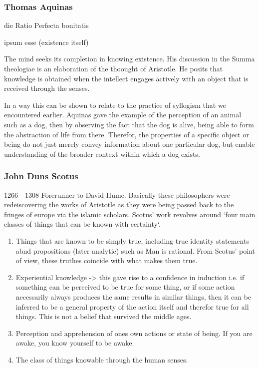 \documentclass[11pt]{article}
\begin{document}
\subsubsection{Thomas Aquinas}
\label{sec:org2318fad}
die Ratio Perfecta bonitatis

ipsum esse (existence itself)

The mind seeks its completion in knowing existence.
His discussion in the Summa theologiae is an elaboration of the thoought
of Aristotle. He posits that knowledge is obtained when the intellect 
engages actively with an object that is received through the senses. 

In a way this can be shown to relate to the practice of syllogism
that we encountered earlier. Aquinas gave the example of the perception
of an animal such as a dog, then by observing the fact that the dog is
alive, being able to form the abstraction of life from there. Therefor, 
the properties of a specific object or being do not just merely convey
information about one particular dog, but enable understanding of the 
broader context within which a dog exists.

\subsubsection{John Duns Scotus}
\label{sec:org94ce1eb}
1266 - 1308
Forerunner to David Hume. Basically these philosophers were
redeiscovering the works of Aristotle as they were being passed back
to the fringes of europe via the islamic scholars. Scotus' work
revolves around `four main classes of things that can be known
with certainty`. 
\begin{enumerate}
\item Things that are known to be simply true, including true identity
statements abnd propositions (later analytic) such as Man is 
rational. From Scotus' point of view, these truthes coincide
with what makes them true.
\item Experiential knowledge -> this gave rise to a confidence in 
induction i.e. if something can be perceived to be true for 
some thing, or if some action necessarily always produces 
the same results in similar things, then it can be inferred 
to be a general property of the action itself and therefor 
true for all things. This is not a belief that survived the 
middle ages.
\item Perception and apprehension of ones own actions or state 
of being. If you are awake, you know yourself to be awake.
\item The class of things knowable through the human senses.
\end{enumerate}
\end{document}
